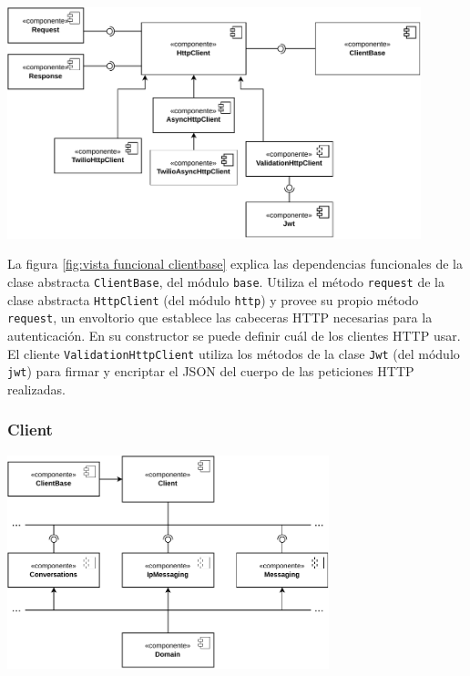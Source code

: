 \documentclass{article}
\begin{document}
\begin{center}
  \includegraphics[width=0.9\textwidth]{VistaFuncionalClienteBase.pdf}
  \label{fig:vista funcional clientbase}
\end{center}

\hfill

La figura \ref{fig:vista funcional clientbase}
explica las dependencias funcionales de
la clase abstracta \verb|ClientBase|,
del módulo \verb|base|.
Utiliza el método \verb|request|
de la clase abstracta \verb|HttpClient|
(del módulo \verb|http|)
y provee su propio método \verb|request|,
un envoltorio que establece las cabeceras HTTP necesarias para la autenticación.
En su constructor se puede definir cuál de los clientes HTTP usar.
El cliente \verb|ValidationHttpClient|
utiliza los métodos de la clase \verb|Jwt|
(del módulo \verb|jwt|)
para firmar y encriptar el JSON del cuerpo
de las peticiones HTTP realizadas.

\subsubsection{Client}

\hfill

\begin{center}
  \includegraphics[width=0.7\textwidth]{VistaFuncionalCliente.pdf}
  \label{fig:vista funcional client}
\end{center}
\end{document}
